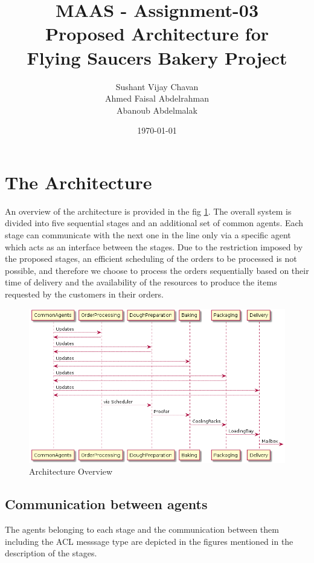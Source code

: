 \documentclass[11pt, a4paper]{article}
\title{MAAS - Assignment-03\\
Proposed Architecture for \\Flying Saucers Bakery Project}
\author{Sushant Vijay Chavan\\Ahmed Faisal Abdelrahman\\Abanoub Abdelmalak}
\date{\today}
\begin{document}
\maketitle
\newpage
\newpage

\section{The Architecture}
An overview of the architecture is provided in the fig \ref{architecture_overview}. The overall system is divided into five sequential stages and an additional set of common agents. Each stage can communicate with the next one in the line only via a specific agent which acts as an interface between the stages. Due to the restriction imposed by the proposed stages, an efficient scheduling of the orders to be processed is not possible, and therefore we choose to process the orders sequentially based on their time of delivery and the availability of the resources to produce the items requested by the customers in their orders.

\begin{figure}[h!]
	\centering
	\includegraphics[scale=0.5]{../Architecture/Architecture_Stages.png}
	\caption{Architecture Overview}
	\label{architecture_overview}
\end{figure}

\pagebreak
\subsection{Communication between agents}
The agents belonging to each stage and the communication between them including the ACL messsage type are depicted in the figures mentioned in the description of the stages.
\end{document}
